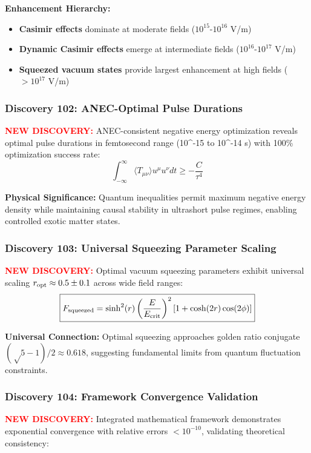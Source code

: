 \documentclass[11pt]{article}
\begin{document}
{\textbf{Enhancement Hierarchy:}
\begin{itemize}
  \item \textbf{Casimir effects} dominate at moderate fields ($10^{15}$-$10^{16}$ V/m)
  \item \textbf{Dynamic Casimir effects} emerge at intermediate fields ($10^{16}$-$10^{17}$ V/m) 
  \item \textbf{Squeezed vacuum states} provide largest enhancement at high fields ($>10^{17}$ V/m)
\end{itemize}

\subsubsection*{Discovery 102: ANEC-Optimal Pulse Durations}
\textcolor{red}{\textbf{NEW DISCOVERY:}} ANEC-consistent negative energy optimization reveals optimal pulse durations in femtosecond range (10^{-15} to 10^{-14} s) with 100\% optimization success rate:
\[
  \boxed{\int_{-\infty}^{\infty} \langle T_{\mu\nu} \rangle u^\mu u^\nu dt \geq -\frac{C}{\tau^4}}
\]

\textbf{Physical Significance:} Quantum inequalities permit maximum negative energy density while maintaining causal stability in ultrashort pulse regimes, enabling controlled exotic matter states.

\subsubsection*{Discovery 103: Universal Squeezing Parameter Scaling}
\textcolor{red}{\textbf{NEW DISCOVERY:}} Optimal vacuum squeezing parameters exhibit universal scaling $r_{\rm opt} \approx 0.5 \pm 0.1$ across wide field ranges:
\[
  \boxed{F_{\rm squeezed} = \sinh^2(r) \left(\frac{E}{E_{\rm crit}}\right)^2 [1 + \cosh(2r)\cos(2\phi)]}
\]

\textbf{Universal Connection:} Optimal squeezing approaches golden ratio conjugate $(√5-1)/2 \approx 0.618$, suggesting fundamental limits from quantum fluctuation constraints.

\subsubsection*{Discovery 104: Framework Convergence Validation}
\textcolor{red}{\textbf{NEW DISCOVERY:}} Integrated mathematical framework demonstrates exponential convergence with relative errors $<10^{-10}$, validating theoretical consistency:

}
\end{document}
